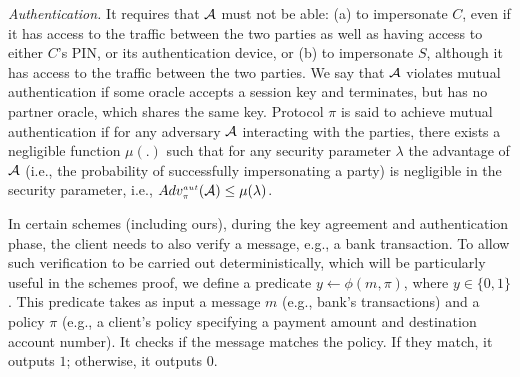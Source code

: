 


\noindent\textit{Authentication.} It requires that $\mathcal{A}$ must not be able: (a)  to impersonate $C$, even if it has access to the traffic between the two parties as well as having access to either $C$'s PIN, or its authentication device, or (b) to impersonate  $S$, although it has access to the traffic between the two parties.   We say that   $\mathcal{A}$  violates mutual authentication if some oracle accepts a session key and terminates, but has no partner oracle, which shares the same key.  Protocol $\pi$ is said to achieve mutual authentication if for any adversary $\mathcal{A}$  interacting with the parties, there exists a negligible function $\mu(.)$ such that for any security parameter $\lambda$ the advantage of $\mathcal{A}$ (i.e., the probability of successfully impersonating a party)  is negligible in the security parameter, i.e., 
%
$Adv_{\scriptscriptstyle\pi}^{\scriptscriptstyle aut}(\mathcal{A})\leq \mu(\lambda)$.


In certain schemes (including ours), during the key agreement and authentication phase, the client needs to also verify a message, e.g., a bank transaction. To allow such verification to be carried out deterministically, which will be particularly useful in the schemes proof, we define a predicate $y\leftarrow \phi(m, \pi)$, where $y\in \{0,1\}$. This predicate takes as input a message $m$ (e.g., bank's transactions) and a policy $\pi$ (e.g., a client's policy specifying a payment amount and destination account number). It checks if the message matches the policy. If they match, it outputs $1$; otherwise, it outputs $0$.  













